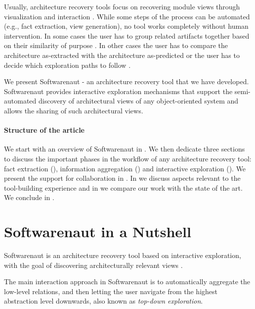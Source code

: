 \documentclass[preprint,12pt]{elsarticle}
\begin{document}
Usually, architecture recovery tools focus on recovering module views through visualization and interaction \cite{murphy-reflexion, muller-rigi, storey-shrimp}. While some steps of the process can be automated (e.g., fact extraction, view generation), no tool works completely without human intervention. In some cases the user has to group related artifacts together based on their similarity of purpose \cite{muller-rigi}. In other cases the user has to compare the architecture as-extracted with the architecture as-predicted \cite{murphy-reflexion} or the user has to decide which exploration paths to follow \cite{storey-shrimp}.

We present Softwarenaut \cite{lungu-relevo, lungu-packages} - an architecture recovery tool that we have developed. Softwarenaut provides interactive exploration mechanisms that support the semi-automated discovery of architectural views of any object-oriented system and allows the sharing of such architectural views. 

\paragraph{Structure of the article} We start with an overview of Softwarenaut in . We then dedicate three sections to discuss the important phases in the workflow of any architecture recovery tool: fact extraction (), information aggregation () and interactive exploration (). We present the support for collaboration in . In  we discuss aspects relevant to the tool-building experience and in  we compare our work with the state of the art. We conclude in .

\section {Softwarenaut in a Nutshell} \label{sec:over}

Softwarenaut is an architecture recovery tool based on interactive exploration, with the goal of discovering architecturally relevant views \cite{lungu-packages}.

The main interaction approach in Softwarenaut is to automatically aggregate the low-level relations, and then letting the user navigate from the highest abstraction level downwards, also known as {\em top-down exploration}.
\end{document}
